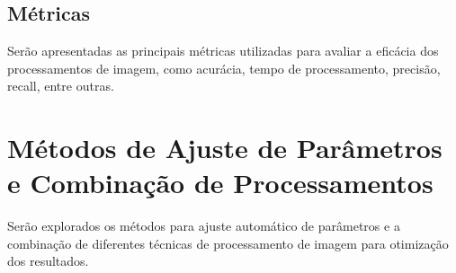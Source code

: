 \subsection{Métricas}
Serão apresentadas as principais métricas utilizadas para avaliar a eficácia dos processamentos de imagem, como acurácia, tempo de processamento, precisão, recall, entre outras.

\section{Métodos de Ajuste de Parâmetros e Combinação de Processamentos}
Serão explorados os métodos para ajuste automático de parâmetros e a combinação de diferentes técnicas de processamento de imagem para otimização dos resultados.